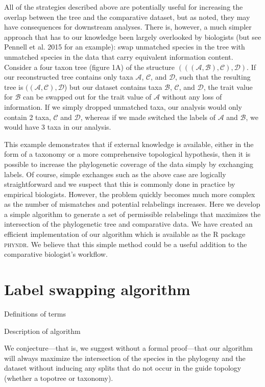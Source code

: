 \documentclass[a4paper,11pt]{article}
\begin{document}
All of the strategies described above are potentially useful for increasing the overlap between the tree and the comparative dataset, but as noted, they may have consequences for downstream analyses. There is, however, a much simpler approach that has to our knowledge been largely overlooked by biologists (but see Pennell et al. 2015 for an example): swap unmatched species in the tree with unmatched species in the data that carry equivalent information content. Consider a four taxon tree (figure 1A) of the structure $(((\mathcal{A},\mathcal{B}),\mathcal{C}),\mathcal{D})$. If our reconstructed tree contains only taxa $\mathcal{A}$, $\mathcal{C}$, and $\mathcal{D}$, such that the resulting tree is $((\mathcal{A},\mathcal{C}),\mathcal{D}$) but our dataset contains taxa $\mathcal{B}$, $\mathcal{C}$, and $\mathcal{D}$, the trait value for $\mathcal{B}$ can be swapped out for the trait value of $\mathcal{A}$ without any loss of information. If we simply dropped unmatched taxa, our analysis would only contain 2 taxa, $\mathcal{C}$ and $\mathcal{D}$, whereas if we made switched the labels of $\mathcal{A}$ and $\mathcal{B}$, we would have 3 taxa in our analysis.

This example demonstrates that if external knowledge is available, either in the form of a taxonomy or  a more comprehensive topological hypothesis, then it is possible to increase the phylogenetic coverage of the data simply by exchanging labels. Of course, simple exchanges such as the above case are logically straightforward and we suspect that this is commonly done in practice by empirical biologists. However, the problem quickly becomes much more complex as the number of mismatches and potential relabelings increases. Here we develop a simple algorithm to generate a set of permissible relabelings that maximizes the intersection of the phylogenetic tree and comparative data. We have created an efficient implementation of our algorithm which is available as the R package \textsc{phyndr}. We believe that this simple method could be a useful addition to the comparative biologist's workflow.

\section{Label swapping algorithm}

Definitions of terms

Description of algorithm

We conjecture---that is, we suggest without a formal proof---that our algorithm will always maximize the intersection of the species in the phylogeny and the dataset without inducing any splits that do not occur in the guide topology (whether a topotree or taxonomy).
\end{document}
